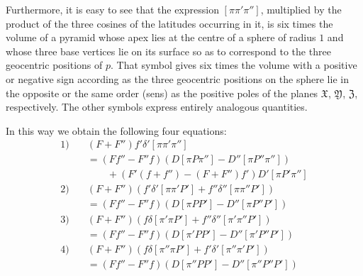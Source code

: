 Furthermore, it is easy to see that the expression $[\pi\pi'\pi'']$, multiplied by the product of the three cosines of the latitudes occurring in it, is six times the volume of a pyramid whose apex lies at the centre of a sphere of radius $1$ and whose three base vertices lie on its surface so as to correspond to the three geocentric positions of $p$. That symbol gives six times the volume with a positive or negative sign according as the three geocentric positions on the sphere lie in the opposite or the same order (sens) as the positive poles of the planes $\mathfrak{X}$, $\mathfrak{Y}$, $\mathfrak{Z}$, respectively. The other symbols express entirely analogous quantities.

In this way we obtain the following four equations:
\[
\begin{aligned}
1)\quad &(F+F'')f'\delta'[\pi\pi'\pi'']\\
&=(Ff''-F''f)(D[\pi P\pi'']-D''[\pi P''\pi''])\\
&\qquad+(F'(f+f'')-(F+F'')f')D'[\pi P'\pi'']\\
2)\quad &(F+F'')(f'\delta'[\pi\pi'P']+f''\delta''[\pi\pi''P'])\\
&=(Ff''-F''f)(D[\pi PP']-D''[\pi P''P'])\\
3)\quad &(F+F'')(f\delta[\pi'\pi P']+f''\delta''[\pi'\pi''P'])\\
&=(Ff''-F''f)(D[\pi'PP']-D''[\pi'P''P'])\\
4)\quad &(F+F'')(f\delta[\pi''\pi P']+f'\delta'[\pi''\pi'P'])\\
&=(Ff''-F''f)(D[\pi''PP']-D''[\pi''P''P'])
\end{aligned}
\]

